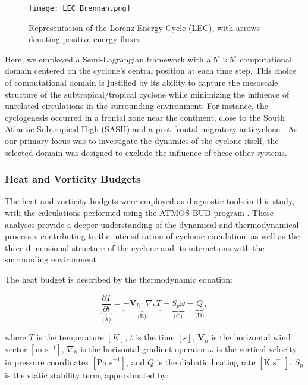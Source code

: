 \documentclass[pdflatex,sn-chicago]{sn-jnl}%
\theoremstyle{plain}
\theoremstyle{definition}
\theoremstyle{remark}
\theoremstyle{definition}
\begin{document}
\begin{figure}[h!]
\centering
\texttt{[image: LEC\_Brennan.png]}
\caption{Representation of the Lorenz Energy Cycle (LEC), with arrows denoting positive energy fluxes.}
\label{fig:LEC_example}
\end{figure}

Here, we employed a Semi-Lagrangian framework \citep{michaelides1999quasi} with a $5^\circ \times 5^\circ$ computational domain centered on the cyclone's central position at each time step. This choice of computational domain is justified by its ability to capture the mesoscale structure of the subtropical/tropical cyclone while minimizing the influence of unrelated circulations in the surrounding environment. For instance, the cyclogenesis occurred in a frontal zone near the continent, close to the South Atlantic Subtropical High (SASH) and a post-frontal migratory anticyclone \citep{reboita2024assessment}. As our primary focus was to investigate the dynamics of the cyclone itself, the selected domain was designed to exclude the influence of these other systems.

\subsubsection{Heat and Vorticity Budgets}

The heat and vorticity budgets were employed as diagnostic tools in this study, with the calculations performed using the ATMOS-BUD program \citep{de2025atmosbud}. These analyses provide a deeper understanding of the dynamical and thermodynamical processes contributing to the intensification of cyclonic circulation, as well as the three-dimensional structure of the cyclone and its interactions with the surrounding environment \citep[e.g.,][]{dutra2017structure}.

The heat budget is described by the thermodynamic equation:

\begin{equation}
\underbrace{\frac{\partial T}{\partial t}}_{\text{(A)}} = 
\underbrace{-\mathbf{V}_h \cdot \nabla_h T}_{\text{(B)}} 
- \underbrace{S_p \omega}_{\text{(C)}} 
+ \underbrace{Q}_{\text{(D)}},
\end{equation}

where \(T\) is the temperature \([K]\), \(t\) is the time \([s]\), \(\mathbf{V}_h\) is the horizontal wind vector \([\text{m s}^{-1}]\), \(\nabla_h\) is the horizontal gradient operator \(\omega\) is the vertical velocity in pressure coordinates \([\text{Pa s}^{-1}]\), and \(Q\) is the diabatic heating rate \([\text{K s}^{-1}]\). \(S_p\) is the static stability term, approximated by:
\end{document}
